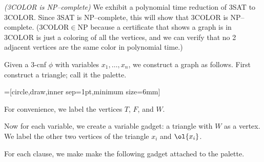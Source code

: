 \pagebreak

\begin{problem}{\it(3COLOR is NP--complete)}
We exhibit a polynomial time reduction of 3SAT to 3COLOR. Since 3SAT is NP--complete, this will show that 3COLOR is NP--complete. (3COLOR$\in $NP because a certificate that shows a graph is in 3COLOR is just a coloring of all the vertices, and we can verify that no 2 adjacent vertices are the same color in polynomial time.)

Given a 3-cnf $\phi$ with variables $x_1,\ldots, x_n$, we construct a graph as follows. First construct a triangle; call it the palette.

=[circle,draw,inner sep=1pt,minimum size=6mm]
\begin{center}
\end{center}
For convenience, we label the vertices $T$, $F$, and $W$.

Now for each variable, we create a variable gadget: a triangle with $W$ as a vertex. We label the other two vertices of the triangle $x_i$ and $\ol{x_i}$.

\begin{center}
\end{center}

For each clause, we make make the following gadget attached to the palette.


\end{problem}
